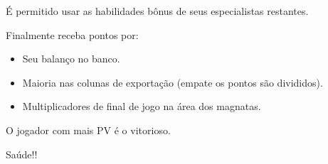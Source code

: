 \documentclass[11pt]{article}
\begin{document}
É permitido usar as habilidades bônus de seus especialistas restantes.

Finalmente receba pontos por:

\begin{itemize}
\item Seu balanço no banco.
\item Maioria nas colunas de exportação (empate os pontos são divididos).
\item Multiplicadores de final de jogo na área dos magnatas.
\end{itemize}

O jogador com mais PV é o vitorioso.

Saúde!!
\end{document}
